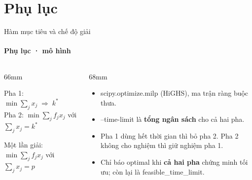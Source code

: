 \documentclass[aspectratio=169, 10pt, t, xcolor=table]{beamer}
\newcommand{\Flead}{\fontsize{8}{11}\selectfont}
\newcommand{\code}[1]{{\ttfamily #1}}
\newcommand{\slidefoot}{}
\newcommand{\sfoot}[1]{\gdef\slidefoot{#1}}
\newenvironment{bul}[1][1.3mm]{\begin{itemize}\setlength{\itemsep}{#1}}{\end{itemize}}
\begin{document}
\appendix
\section{Phụ lục}

\sfoot{Phụ lục · \code{src/model\_main.py}}
\begin{frame}{Hàm mục tiêu và chế độ giải}
  \framesubtitle{Phụ lục · mô hình}
  \begin{columns}[T, onlytextwidth]
    \begin{column}{66mm}
      \begin{card}[fontupper=\Flead\color{soft}, title={Mặc định: \code{min\_stations\_then\_cost}}]
        Pha 1: $\min \sum_j x_j \;\Rightarrow\; k^*$\\[1mm]
        Pha 2: $\min \sum_j f_j x_j$ \;với\; $\sum_j x_j = k^*$
      \end{card}
      \vspace{3mm}
      \begin{card}[fontupper=\Flead\color{soft}, title={Thử nghiệm: \code{fixed\_station\_count}}]
        Một lần giải: $\min \sum_j f_j x_j$ \;với\; $\sum_j x_j = p$
      \end{card}
    \end{column}
    \begin{column}{68mm}
      \Flead\color{soft}
      \begin{bul}[1.6mm]
        \item \code{scipy.optimize.milp} (HiGHS), ma trận ràng buộc thưa.
        \item \code{--time-limit} là \textbf{tổng ngân sách} cho cả hai pha.
        \item Pha 1 dùng hết thời gian thì bỏ pha 2. Pha 2 không cho nghiệm thì giữ nghiệm pha 1.
        \item Chỉ báo \code{optimal} khi \textbf{cả hai pha} chứng minh tối ưu; còn lại là
              \code{feasible\_time\_limit}.
      \end{bul}
    \end{column}
  \end{columns}
\end{frame}
\end{document}
